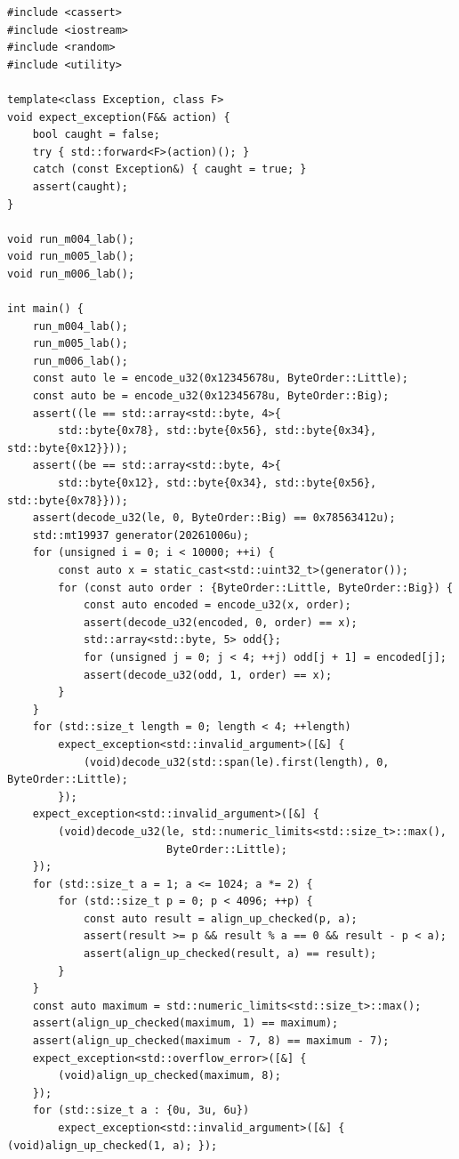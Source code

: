 \begin{verbatim}
#include <cassert>
#include <iostream>
#include <random>
#include <utility>

template<class Exception, class F>
void expect_exception(F&& action) {
    bool caught = false;
    try { std::forward<F>(action)(); }
    catch (const Exception&) { caught = true; }
    assert(caught);
}

void run_m004_lab();
void run_m005_lab();
void run_m006_lab();

int main() {
    run_m004_lab();
    run_m005_lab();
    run_m006_lab();
    const auto le = encode_u32(0x12345678u, ByteOrder::Little);
    const auto be = encode_u32(0x12345678u, ByteOrder::Big);
    assert((le == std::array<std::byte, 4>{
        std::byte{0x78}, std::byte{0x56}, std::byte{0x34}, std::byte{0x12}}));
    assert((be == std::array<std::byte, 4>{
        std::byte{0x12}, std::byte{0x34}, std::byte{0x56}, std::byte{0x78}}));
    assert(decode_u32(le, 0, ByteOrder::Big) == 0x78563412u);
    std::mt19937 generator(20261006u);
    for (unsigned i = 0; i < 10000; ++i) {
        const auto x = static_cast<std::uint32_t>(generator());
        for (const auto order : {ByteOrder::Little, ByteOrder::Big}) {
            const auto encoded = encode_u32(x, order);
            assert(decode_u32(encoded, 0, order) == x);
            std::array<std::byte, 5> odd{};
            for (unsigned j = 0; j < 4; ++j) odd[j + 1] = encoded[j];
            assert(decode_u32(odd, 1, order) == x);
        }
    }
    for (std::size_t length = 0; length < 4; ++length)
        expect_exception<std::invalid_argument>([&] {
            (void)decode_u32(std::span(le).first(length), 0, ByteOrder::Little);
        });
    expect_exception<std::invalid_argument>([&] {
        (void)decode_u32(le, std::numeric_limits<std::size_t>::max(),
                         ByteOrder::Little);
    });
    for (std::size_t a = 1; a <= 1024; a *= 2) {
        for (std::size_t p = 0; p < 4096; ++p) {
            const auto result = align_up_checked(p, a);
            assert(result >= p && result % a == 0 && result - p < a);
            assert(align_up_checked(result, a) == result);
        }
    }
    const auto maximum = std::numeric_limits<std::size_t>::max();
    assert(align_up_checked(maximum, 1) == maximum);
    assert(align_up_checked(maximum - 7, 8) == maximum - 7);
    expect_exception<std::overflow_error>([&] {
        (void)align_up_checked(maximum, 8);
    });
    for (std::size_t a : {0u, 3u, 6u})
        expect_exception<std::invalid_argument>([&] { (void)align_up_checked(1, a); });


\end{verbatim}

